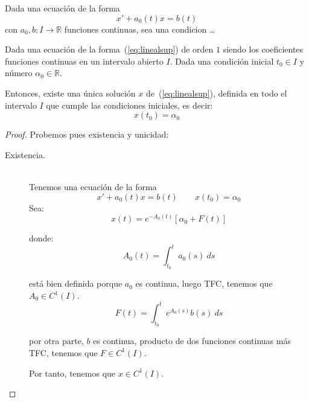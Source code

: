 \begin{prop}
    Dada una ecuación de la forma
    \begin{equation*}
        x' + a_0(t)x = b(t)
    \end{equation*}
    con $a_0,b:I\rightarrow\mathbb{R}$ funciones continuas, sea una condicion \ldots

    Dada una ecuación de la forma~(\ref{eq:linealsup}) de orden $1$ siendo los coeficientes funciones continuas en un intervalo abierto $I$. Dada una condición inicial $t_0\in I$ y número $\alpha_0 \in \mathbb{R}$.

    Entonces, existe una única solución $x$ de~(\ref{eq:linealsup}), definida en todo el intervalo $I$ que cumple las condiciones iniciales, es decir:
    \begin{equation*}
        x(t_0) = \alpha_0 
    \end{equation*}
    
    \begin{proof}
        Probemos pues existencia y unicidad:
        \begin{description}
            \item [Existencia.]~\\
                Tenemos una ecuación de la forma
                \begin{equation*}
                    x' + a_0(t)x = b(t) \qquad x(t_0) = \alpha_0
                \end{equation*}
                Sea:
                \begin{equation*}
                    x(t) = e^{-A_0(t)} [\alpha_0 + F(t)]
                \end{equation*}

                donde:
                \begin{equation*}
                    A_0(t) = \int_{t_0}^{t} a_0(s)~ds 
                \end{equation*}

                está bien definida porque $a_0$ es continua, luego TFC, tenemos que $A_0\in C^1(I)$.
                \begin{equation*}
                    F(t) = \int_{t_0}^{t} e^{A_0(s)}b(s)~ds 
                \end{equation*}

                por otra parte, $b$ es continua, producto de dos funciones continuas más TFC, tenemos que $F\in C^1(I)$.

                Por tanto, tenemos que $x\in C^1(I)$.


\end{description}
\end{proof}
\end{prop}
